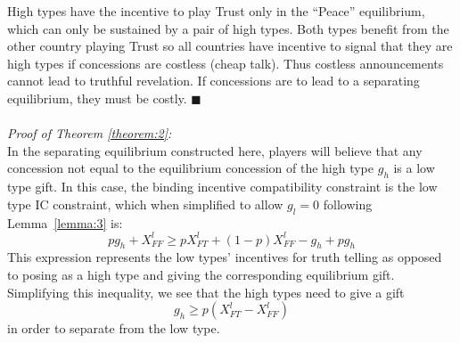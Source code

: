 \documentclass[12pt, letterpaper]{article}
\newcommand{\be}{\begin{equation}}
\newcommand{\ee}{\end{equation}}
\begin{document}
{High types have the incentive to play Trust only in the ``Peace'' equilibrium, which can only be sustained by a pair of high types. Both types benefit from the other country playing Trust so all countries have incentive to signal that they are high types if concessions are costless (cheap talk). Thus costless announcements cannot lead to truthful revelation. If concessions are to lead to a separating equilibrium, they must be costly. \hfill $\blacksquare$
\\
\\
\emph{Proof of Theorem \ref{theorem:2}:}\\
In the separating equilibrium constructed here, players will believe that any concession not equal to the equilibrium concession of the high type $g_h$ is a low type gift.  In this case, the binding incentive compatibility constraint is the low type IC constraint, which when simplified to allow $g_l=0$ following Lemma~\ref{lemma:3} is:\\  
\begin{equation*}
	pg_h +X_{FF}^l \geq pX_{FT}^l+(1-p)X_{FF}^l-g_h+pg_h 
\end{equation*}
This expression represents the low types' incentives for truth telling as opposed to posing as a high type and giving the corresponding equilibrium gift. Simplifying this inequality, we see that the high types need to give a gift 
\be
	g_h \geq p(X_{FT}^l-X_{FF}^l)
	\label{eq:cse}
\ee 
in order to separate from the low type.

}
\end{document}
